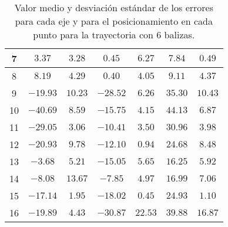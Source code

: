\begin{table}[H]
\begin{tabular}{|c|c|c|c|c|c|c|}
                        7   &   $3.37$    &  $3.28$   &   $0.45$    &  $6.27$   & $7.84$    &  $0.49$   \\ \hline
                        8   &   $8.19$    &  $4.29$   &   $0.40$    &  $4.05$   & $9.11$    &  $4.37$   \\ \hline
                        9   &   $-19.93$  &  $10.23$  &   $-28.52$  &  $6.26$   & $35.30$   &  $10.43$  \\ \hline
                        10  &   $-40.69$  &  $8.59$   &   $-15.75$  &  $4.15$   & $44.13$   &  $6.87$   \\ \hline
                        11  &   $-29.05$  &  $3.06$   &   $-10.41$  &  $3.50$   & $30.96$   &  $3.98$   \\ \hline
                        12  &   $-20.93$  &  $9.78$   &   $-12.10$  &  $0.94$   & $24.68$   &  $8.48$   \\ \hline
                        13  &   $-3.68$   &  $5.21$   &   $-15.05$  &  $5.65$   & $16.25$   &  $5.92$   \\ \hline
                        14  &   $-8.08$   &  $13.67$  &   $-7.85$   &  $4.97$   & $16.99$   &  $7.06$   \\ \hline
                        15  &   $-17.14$  &  $1.95$   &   $-18.02$  &  $0.45$   & $24.93$   &  $1.10$   \\ \hline
                        16  &   $-19.89$  &  $4.43$   &   $-30.87$  &  $22.53$  & $39.88$   &  $16.87$  \\ \hline
                    \end{tabular}
    \caption{Valor medio y desviación estándar de los errores para cada eje y para el posicionamiento en cada punto para la trayectoria con 6 balizas.}
    \label{tab:media_fisica_6_total}
\end{table}

\newpage
